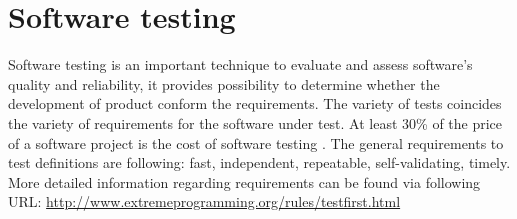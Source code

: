 \chapter{Software testing}
\label{chap:testing}
Software testing is an important technique to evaluate and assess software's quality and reliability, it provides possibility to determine whether the development of product conform the requirements. The variety of tests coincides the variety of requirements for the software under test. At least 30\% of the price of a software project is the cost of software testing \cite{Lecture2}. 
The general requirements to test definitions are following: fast, independent, repeatable, self-validating, timely.
More detailed information regarding requirements can be found via following URL: \url{http://www.extremeprogramming.org/rules/testfirst.html}
